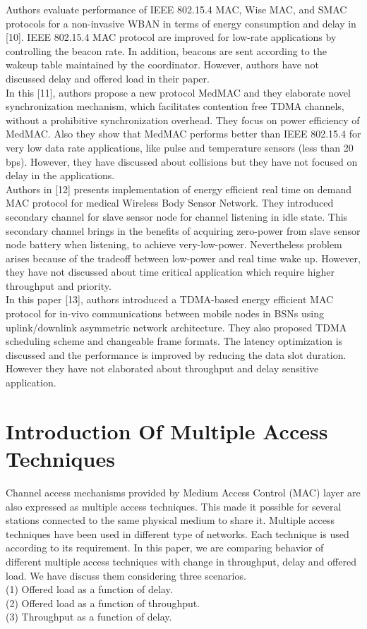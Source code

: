 \documentclass[10pt, conference, compsocconf]{IEEEtran}
\begin{document}
\indent Authors evaluate performance of IEEE 802.15.4 MAC, Wise MAC, and SMAC protocols for a non-invasive WBAN in terms of energy consumption and delay in [10]. IEEE 802.15.4 MAC protocol are improved for low-rate applications by controlling the beacon rate. In addition, beacons are sent according to the wakeup table maintained by the coordinator. However, authors have not discussed delay and offered load in their paper.\\
\indent In this [11], authors propose a new protocol MedMAC and they elaborate novel synchronization mechanism, which facilitates contention free TDMA channels, without a prohibitive synchronization overhead. They focus on power efficiency of MedMAC. Also they show that MedMAC performs better than IEEE 802.15.4 for very low data rate applications, like pulse and temperature sensors (less than 20 bps). However, they have discussed about collisions but they have not focused on delay in the applications.\\
\indent Authors in [12] presents implementation of energy efficient real time on demand MAC protocol for medical Wireless Body Sensor Network. They introduced secondary channel for slave sensor node for channel listening in idle state. This secondary channel brings in the benefits of acquiring zero-power from slave sensor node battery when listening, to achieve very-low-power. Nevertheless problem arises because of the tradeoff between low-power and real time wake up. However, they have not discussed about time critical application which require higher throughput and priority.\\
\indent In this paper [13], authors introduced a TDMA-based energy efficient MAC protocol for in-vivo communications between mobile nodes in BSNs using uplink/downlink asymmetric network architecture. They also proposed TDMA scheduling scheme and changeable frame formats. The latency optimization is discussed and the performance is improved by reducing the data slot duration. However they have not elaborated about throughput and delay sensitive application.\\


\section{Introduction Of Multiple Access Techniques}
Channel access mechanisms provided by Medium Access Control (MAC) layer are also expressed as multiple access techniques. This made it possible for several stations connected to the same
physical medium to share it. Multiple access techniques have been used in different type of networks. Each technique is used according to its requirement.
In this paper, we are comparing behavior of different multiple access techniques with change in throughput, delay and offered load.
We have discuss them considering three scenarios.
\\
{(1)} Offered load as a function of delay.
\\
{(2)} Offered load as a function of throughput.
\\
{(3)} Throughput as a function of delay.
\end{document}
